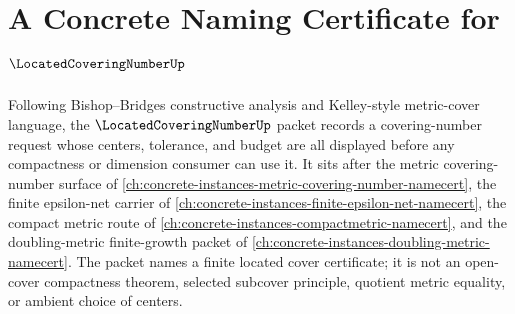 \chapter{A Concrete Naming Certificate for $\LocatedCoveringNumberUp$}
\label{ch:concrete-instances-located-covering-number-namecert}

Following Bishop--Bridges constructive analysis and Kelley-style metric-cover language, the $\LocatedCoveringNumberUp$ packet records a covering-number request whose centers, tolerance, and budget are all displayed before any compactness or dimension consumer can use it. It sits after the metric covering-number surface of \autoref{ch:concrete-instances-metric-covering-number-namecert}, the finite epsilon-net carrier of \autoref{ch:concrete-instances-finite-epsilon-net-namecert}, the compact metric route of \autoref{ch:concrete-instances-compactmetric-namecert}, and the doubling-metric finite-growth packet of \autoref{ch:concrete-instances-doubling-metric-namecert}. The packet names a finite located cover certificate; it is not an open-cover compactness theorem, selected subcover principle, quotient metric equality, or ambient choice of centers.

